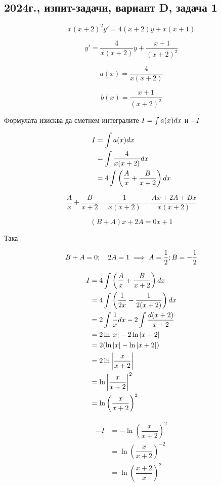 \documentclass{scrartcl}
\begin{document}
\subsection{2024г., изпит-задачи, вариант D, задача 1}

$$x(x+2)^2y' = 4(x+2)y + x(x+1)$$

$$y' = \dfrac{4}{x(x+2)}y+\dfrac{x+1}{(x+2)^2}$$

$$a(x) = \dfrac{4}{x(x+2)}$$

$$b(x) = \dfrac{x+1}{(x+2)^2}$$

Формулата изисква да сметнем интегралите $I = \int a(x) \space dx$ и $-I$

\begin{align*}
\displaystyle I
&= \int a(x) \space dx\\
&= \int\dfrac{4}{x(x+2)} \space dx\\
&= 4\int\left(\dfrac{A}{x} + \dfrac{B}{x+2}\right)\space dx\\
\end{align*}

$$\dfrac{A}{x} + \dfrac{B}{x+2} = \dfrac{1}{x(x+2)} = \dfrac{Ax+2A+Bx}{x(x+2)}$$

$$(B+A)x+2A=0x+1$$

Така

$$B+A=0;\quad 2A=1\implies A=\dfrac{1}{2};\space B=-\dfrac{1}{2}$$

\begin{align*}
\displaystyle I
&= 4\int\left(\dfrac{A}{x} + \dfrac{B}{x+2}\right)\space dx\\
&= 4\int\left(\dfrac{1}{2x} - \dfrac{1}{2(x+2)}\right)\space dx\\
&= 2\int\dfrac{1}{x}\space dx - 2\int\dfrac{d(x+2)}{x+2}\\
&= 2\ln{|x|} - 2\ln{|x+2|}\\
&= 2(\ln{|x|} - \ln{|x+2|})\\
&= 2\ln{\left|\dfrac{x}{x+2}\right|}\\
&= \ln{\left|\dfrac{x}{x+2}\right|^2}\\
&= \ln{\left(\dfrac{x}{x+2}\right)^2}
\end{align*}

\begin{align*}
\displaystyle -I
&= -\ln{\left(\dfrac{x}{x+2}\right)^2}\\
&= \ln{\left(\dfrac{x}{x+2}\right)^{-2}}\\
&= \ln{\left(\dfrac{x+2}{x}\right)^{2}}\\
\end{align*}
\end{document}
